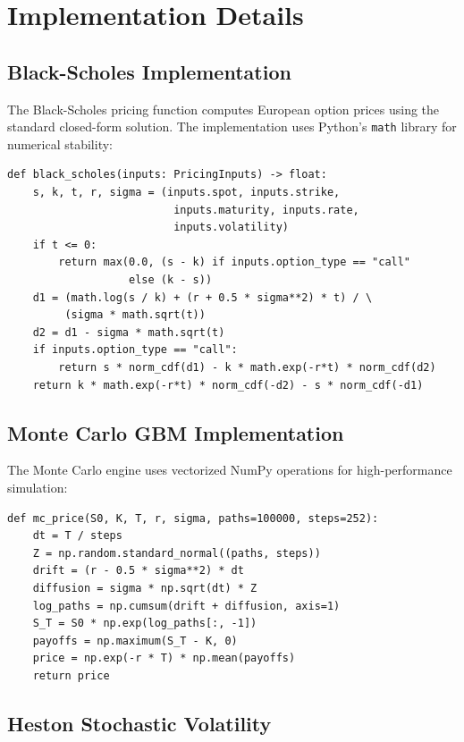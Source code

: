 \documentclass[12pt,a4paper]{report}
\begin{document}
\section{Implementation Details}

\subsection{Black-Scholes Implementation}

The Black-Scholes pricing function computes European option prices using the standard closed-form solution. The implementation uses Python's \texttt{math} library for numerical stability:

\begin{lstlisting}[style=pythonstyle, caption={Black-Scholes Pricing Implementation}, label={lst:bs}]
def black_scholes(inputs: PricingInputs) -> float:
    s, k, t, r, sigma = (inputs.spot, inputs.strike,
                          inputs.maturity, inputs.rate,
                          inputs.volatility)
    if t <= 0:
        return max(0.0, (s - k) if inputs.option_type == "call"
                   else (k - s))
    d1 = (math.log(s / k) + (r + 0.5 * sigma**2) * t) / \
         (sigma * math.sqrt(t))
    d2 = d1 - sigma * math.sqrt(t)
    if inputs.option_type == "call":
        return s * norm_cdf(d1) - k * math.exp(-r*t) * norm_cdf(d2)
    return k * math.exp(-r*t) * norm_cdf(-d2) - s * norm_cdf(-d1)
\end{lstlisting}

\subsection{Monte Carlo GBM Implementation}

The Monte Carlo engine uses vectorized NumPy operations for high-performance simulation:

\begin{lstlisting}[style=pythonstyle, caption={Monte Carlo GBM Pseudocode}, label={lst:mc}]
def mc_price(S0, K, T, r, sigma, paths=100000, steps=252):
    dt = T / steps
    Z = np.random.standard_normal((paths, steps))
    drift = (r - 0.5 * sigma**2) * dt
    diffusion = sigma * np.sqrt(dt) * Z
    log_paths = np.cumsum(drift + diffusion, axis=1)
    S_T = S0 * np.exp(log_paths[:, -1])
    payoffs = np.maximum(S_T - K, 0)
    price = np.exp(-r * T) * np.mean(payoffs)
    return price
\end{lstlisting}

\subsection{Heston Stochastic Volatility}
\end{document}
